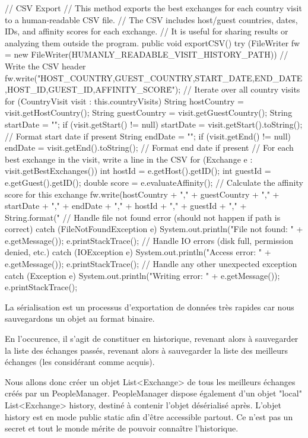 \documentclass{mytex}
\begin{document}
\begin{codebox}
// CSV Export
// This method exports the best exchanges for each country visit to a human-readable CSV file.
// The CSV includes host/guest countries, dates, IDs, and affinity scores for each exchange.
// It is useful for sharing results or analyzing them outside the program.
public void exportCSV() {
	try (FileWriter fw = new FileWriter(HUMANLY_READABLE_VISIT_HISTORY_PATH)) {
		// Write the CSV header
		fw.write("HOST_COUNTRY,GUEST_COUNTRY,START_DATE,END_DATE,HOST_ID,GUEST_ID,AFFINITY_SCORE\r\n");
		// Iterate over all country visits
		for (CountryVisit visit : this.countryVisits) {
			String hostCountry = visit.getHostCountry();
			String guestCountry = visit.getGuestCountry();
			String startDate = "";
			if (visit.getStart() != null) startDate = visit.getStart().toString(); // Format start date if present
			String endDate = "";
			if (visit.getEnd() != null) endDate = visit.getEnd().toString(); // Format end date if present
			// For each best exchange in the visit, write a line in the CSV
			for (Exchange e : visit.getBestExchanges()) {
				int hostId = e.getHost().getID();
				int guestId = e.getGuest().getID();
				double score = e.evaluateAffinity(); // Calculate the affinity score for this exchange
				fw.write(hostCountry + "," + guestCountry + "," + startDate + "," + endDate + "," +
				hostId + "," + guestId + "," + String.format("%
			}
		}
	} 
	// Handle file not found error (should not happen if path is correct)
	catch (FileNotFoundException e) {
		System.out.println("File not found: " + e.getMessage());
		e.printStackTrace();
	}
	// Handle IO errors (disk full, permission denied, etc.)
	catch (IOException e) {
		System.out.println("Access error: " + e.getMessage());
		e.printStackTrace();
	}
	// Handle any other unexpected exception
	catch (Exception e) {
		System.out.println("Writing error: " + e.getMessage());
		e.printStackTrace();
	}
}
\end{codebox}


La sérialisation est un processus d'exportation de données très rapides car nous sauvegardons un objet au format binaire.

En l'occurence, il s'agit de constituer en historique, revenant alors à sauvegarder la liste des échanges passés, revenant alors à sauvegarder la liste des meilleurs échanges (les considérant comme acquis).

Nous allons donc créer un objet List<Exchange> de tous les meilleurs échanges créés par un PeopleManager.
PeopleManager dispose également d'un objet "local" List<Exchange> history, destiné à contenir l'objet désérialisé après. L'objet history est en mode public static afin d'être accessible partout. Ce n'est pas un secret et tout le monde mérite de pouvoir connaître l'historique.
\end{document}
